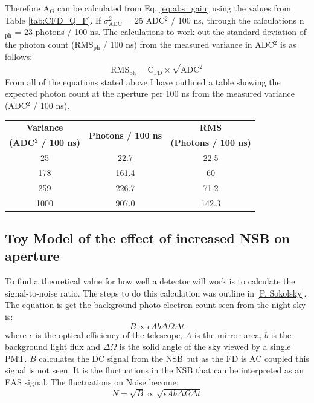 Therefore A$_{\mathrm{G}}$ can be calculated from Eq. \ref{eq:abs_gain} using the values from Table \ref{tab:CFD_Q_F}. If $\sigma^2_{\mathrm{ADC}}$ = 25 ADC$^2$ / 100 ns, through the calculations n$_{\mathrm{ph}}$ = 23 photons / 100 ns. The calculations to work out the standard deviation of the photon count (RMS$_{\mathrm{ph}}$ / 100 ns) from the measured variance in ADC$^2$ is as follows:
\begin{equation}
\mathrm{RMS}_{\mathrm{ph}} = \mathrm{C}_{\mathrm{FD}} \times \sqrt{\mathrm{ADC}^2}
\end{equation}
From all of the equations stated above I have outlined a table showing the expected photon count at the aperture per 100 ns from the measured variance (ADC$^2$ / 100 ns).
\begin{center}
\begin{tabular}{| c | c | c |}
\hline \hline
\textbf{Variance} & \multirow{2}{*}{\textbf{Photons / 100 ns}} & \textbf{RMS} \\
\textbf{(ADC$^2$ / 100 ns)} & & \textbf{(Photons / 100 ns)} \\
\hline \hline
25  & 22.7 & 22.5 \\
\hline
178  & 161.4 & 60 \\
\hline
259  & 226.7 & 71.2 \\
\hline
1000  & 907.0 & 142.3 \\
\hline
\end{tabular}
\end{center}

\subsection{Toy Model of the effect of increased NSB on aperture}

To find a theoretical value for how well a detector will work is to calculate the signal-to-noise ratio. The steps to do this calculation was outline in \ref{P. Sokolsky}. The equation is get the background photo-electron count seen from the night sky is:
\begin{equation}
B \propto \epsilon A b \Delta \Omega \Delta t
\end{equation}
where $\epsilon$ is the optical efficiency of the telescope, $A$ is the mirror area, $b$ is the background light flux and $\Delta\Omega$ is the solid angle of the sky viewed by a single PMT. $B$ calculates the DC signal from the NSB but as the FD is AC coupled this signal is not seen. It is the fluctuations in the NSB that can be interpreted as an EAS signal. The  fluctuations on Noise become:
\begin{equation}
N = \sqrt{B} \propto \sqrt{\epsilon A b \Delta \Omega \Delta t}
\end{equation}



